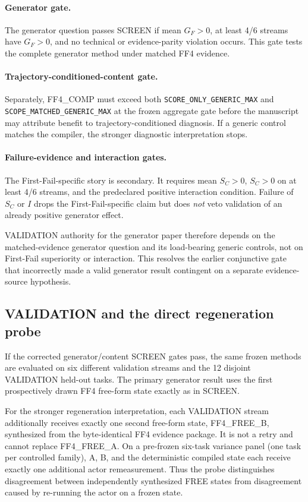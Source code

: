 \paragraph{Generator gate.}
The generator question passes SCREEN if mean $G_F>0$, at least 4/6 streams have $G_F>0$, and no technical or evidence-parity violation occurs. This gate tests the complete generator method under matched FF4 evidence.

\paragraph{Trajectory-conditioned-content gate.}
Separately, FF4\_COMP must exceed both \texttt{SCORE\_ONLY\_GENERIC\_MAX} and \texttt{SCOPE\_MATCHED\_GENERIC\_MAX} at the frozen aggregate gate before the manuscript may attribute benefit to trajectory-conditioned diagnosis. If a generic control matches the compiler, the stronger diagnostic interpretation stops.

\paragraph{Failure-evidence and interaction gates.}
The First-Fail-specific story is secondary. It requires mean $S_C>0$, $S_C>0$ on at least 4/6 streams, and the predeclared positive interaction condition. Failure of $S_C$ or $I$ drops the First-Fail-specific claim but does \emph{not} veto validation of an already positive generator effect.

VALIDATION authority for the generator paper therefore depends on the matched-evidence generator question and its load-bearing generic controls, not on First-Fail superiority or interaction. This resolves the earlier conjunctive gate that incorrectly made a valid generator result contingent on a separate evidence-source hypothesis.

\subsection{VALIDATION and the direct regeneration probe}
If the corrected generator/content SCREEN gates pass, the same frozen methods are evaluated on six different validation streams and the 12 disjoint VALIDATION held-out tasks. The primary generator result uses the first prospectively drawn FF4 free-form state exactly as in SCREEN.

For the stronger regeneration interpretation, each VALIDATION stream additionally receives exactly one second free-form state, FF4\_FREE\_B, synthesized from the byte-identical FF4 evidence package. It is not a retry and cannot replace FF4\_FREE\_A. On a pre-frozen six-task variance panel (one task per controlled family), A, B, and the deterministic compiled state each receive exactly one additional actor remeasurement. Thus the probe distinguishes disagreement between independently synthesized FREE states from disagreement caused by re-running the actor on a frozen state.

